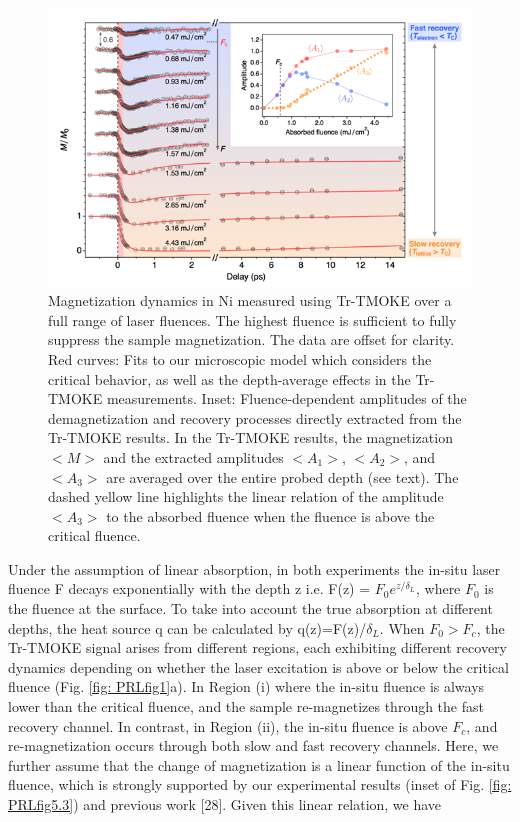 \begin{figure}
	\label{fig: PRLfig3}
	\begin{center}
		\includegraphics[width=150mm]{figs/PRLFig3}
	\end{center}
\caption{Magnetization dynamics in Ni measured using Tr-TMOKE over a full range of laser fluences. The highest fluence is sufficient to fully suppress the sample magnetization. The data are offset for clarity. Red curves: Fits to our microscopic model which considers the critical behavior, as well as the depth-average effects in the Tr-TMOKE measurements. Inset: Fluence-dependent amplitudes of the demagnetization and recovery processes directly extracted from the Tr-TMOKE results. In the Tr-TMOKE results, the magnetization $<M>$ and the extracted amplitudes $<A_1>$, $<A_2>$, and $<A_3>$ are averaged over the entire probed depth (see text). The dashed yellow line highlights the linear relation of the amplitude $<A_3>$ to the absorbed fluence when the fluence is above the critical fluence.}
\end{figure}

Under the assumption of linear absorption, in both experiments the in-situ laser fluence F decays exponentially with the depth z i.e. F(z) = $F_0 e^{z/\delta_L}$, where $F_0$ is the fluence at the surface. To take into account the true absorption at different depths, the heat source q can be calculated by q(z)=F(z)/$\delta_L$. When  $F_0 > F_c$, the Tr-TMOKE signal arises from different regions, each exhibiting different recovery dynamics depending on whether the laser excitation is above or below the critical fluence (Fig. \ref{fig: PRLfig1}a). In Region (i) where the in-situ fluence is always lower than the critical fluence, and the sample re-magnetizes through the fast recovery channel. In contrast, in Region (ii), the in-situ fluence is above $F_c$, and re-magnetization occurs through both slow and fast recovery channels.  Here, we further assume that the change of magnetization is a linear function of the in-situ fluence, which is strongly supported by our experimental results (inset of Fig. \ref{fig: PRLfig5.3}) and previous work [28]. Given this linear relation, we have 

